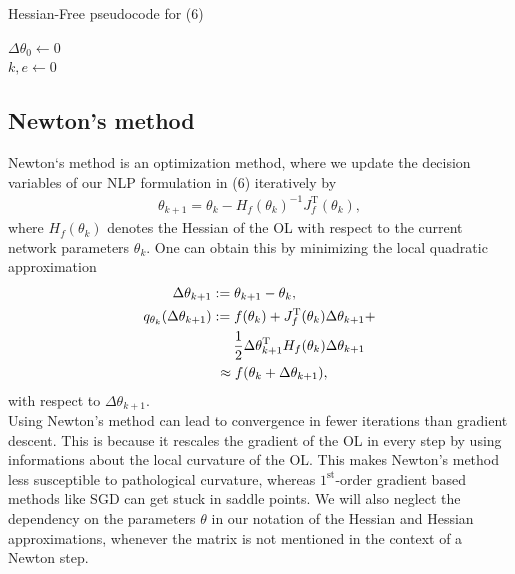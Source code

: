 \documentclass[conference]{IEEEtran}
\begin{document}
	\begin{algorithm}
		\caption{Hessian-Free pseudocode for (6)}\label{alg:two}
		$\Delta\theta_{0}\gets 0$\\
		$k, e\gets 0$\\
		\KwOut{$\theta^{\star}$}
	\end{algorithm}


	\subsection{Newton's method}
	\noindent
	Newton`s method is an optimization method, where we update the decision variables of our NLP formulation in (6) iteratively by
	\begin{align}
	\theta_{k+1} = \theta_{k} -H_{f}(\theta_{k})^{-1} J_{f}^{\mathrm{T}}(\theta_{k}),
	\end{align}
	where $H_{f}(\theta_{k})$ denotes the Hessian of the OL with respect to the current network parameters $\theta_{k}$. One can obtain this by minimizing the local quadratic approximation
	\begin{align}
	\text{ }\Delta\theta_{k+1} &:= \theta_{k+1} - \theta_{k},\\
	q_{\theta_{k}}(\Delta\theta_{k+1})&:= f(\theta_{k}) + J_{f}^{\mathrm{T}}(\theta_{k})\Delta\theta_{k+1} + \notag\\
	&\:\:\:\:\:\:\:\frac{1}{2}\Delta\theta_{k+1}^{\mathrm{T}}H_{f}(\theta_{k})\Delta\theta_{k+1}\\
	&\text{ }\approx f(\theta_{k} + \Delta\theta_{k+1}),
	\end{align}
	with respect to $\Delta\theta_{k+1}$. \\
	Using Newton's method can lead to convergence in fewer iterations than gradient descent. This is because it rescales the gradient of the OL in every step by using informations about the local curvature of the OL. This makes Newton's method less susceptible to pathological curvature, whereas $1^{\text{st}}$-order gradient based methods like SGD can get stuck in saddle points. We will also neglect the dependency on the parameters $\theta$ in our notation of the Hessian and Hessian approximations, whenever the matrix is not mentioned in the context of a Newton step.
\end{document}
